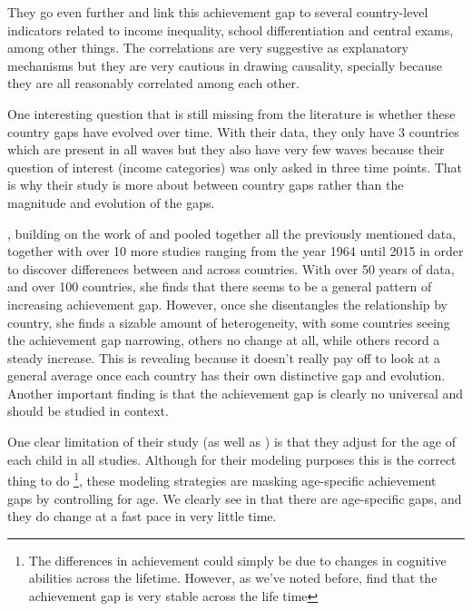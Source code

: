 \documentclass[11pt, a4paper]{article}\usepackage[]{graphicx}\usepackage[]{color}
\begin{document}
They go even further and link this achievement gap to several country-level indicators related to income inequality, school differentiation and central exams, among other things. The correlations are very suggestive  as explanatory mechanisms but they are very cautious in drawing causality, specially because they are all reasonably correlated among each other.

One interesting question that is still missing from the literature is whether these country gaps have evolved over time. With their data, they only have 3 countries which are present in all waves but they also have very few waves because their question of interest (income categories) was only asked in three time points. That is why their study is more about between country gaps rather than the magnitude and evolution of the gaps.

\citet{anna2016_global}, building on the work of \citet{anna2016} and \citet{reardon_portilla} pooled together all the previously mentioned data, together with over 10 more studies ranging from the year 1964 until 2015 in order to discover differences between and across countries. With over 50 years of data, and over 100 countries, she finds that there seems to be a general pattern of increasing achievement gap. However, once she disentangles the relationship by country, she finds a sizable amount of heterogeneity, with some countries seeing the achievement gap narrowing, others no change at all, while others record a steady increase. This is revealing because it doesn't really pay off to look at a general average once each country has their own distinctive gap and evolution. Another important finding is that the achievement gap is clearly no universal and should be studied in context. 

One clear limitation of their study (as well as \citet{reardon2011}) is that they adjust for the age of each child in all studies. Although for their modeling purposes this is the correct thing to do \footnote{The differences in achievement could simply be due to changes in cognitive abilities across the lifetime. However, as we've noted before, \citet{bradbury2015} find that the achievement gap is very stable across the life time}, these modeling strategies are masking age-specific achievement gaps by controlling for age. We clearly see in \citet{reardon_portilla} that there are age-specific gaps, and they do change at a fast pace in very little time.
\end{document}
